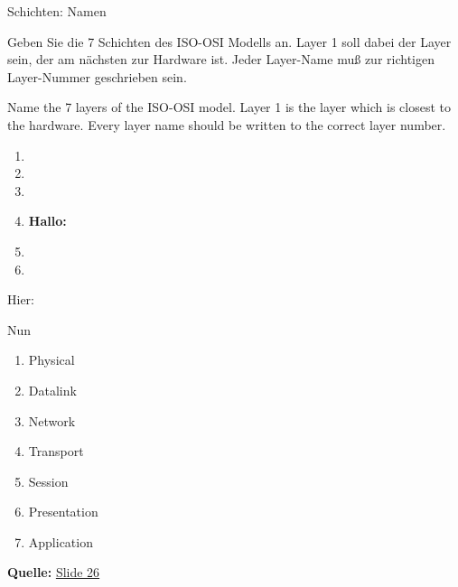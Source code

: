 \documentclass{../../../../sty/adam-exam-v1.1}
\date{11. 02. 2026}
\begin{document}

\makeexam

\begin{question}{Schichten: Namen}
{%
Geben Sie die 7 Schichten des ISO-OSI Modells an. Layer 1 soll dabei der Layer sein,
der am nächsten zur Hardware ist. Jeder Layer-Name muß zur richtigen Layer-Nummer geschrieben sein.

Name the 7 layers of the ISO-OSI model. Layer 1 is the layer which is closest to the hardware.
Every layer name should be written to the correct layer number.
\bigskip\bigskip
}
{%
\begin{enumerate} 
\item  {}
\item  {}
\item  {}
\item  \textbf{Hallo:} 
\item  {}
\item  {}
\end{enumerate}

Hier: 

Nun


}
{%
\vspace*{-0.3cm}
\begin{enumerate}
\item \cb Physical
\item \cb Datalink
\item \cb Network
\item \cb Transport
\item \cb Session
\item \cb Presentation
\item \cb Application
\end{enumerate}
\vspace*{-0.3cm}


\textbf{Quelle:} \href{https://iuk.one/1010-1009.pdf\#page=26}{Slide 26}
}
\end{question}


\emptypage\emptypage
\adjustfordoublesidedprinting

\end{document}
